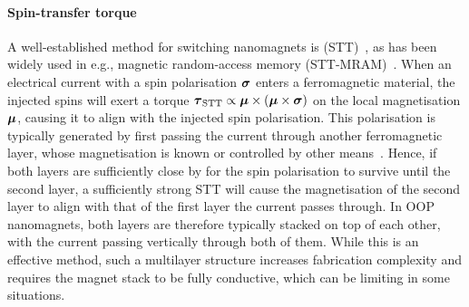 \paragraph{Spin-transfer torque}
A well-established method for switching nanomagnets is  (STT)~\cite{SlonczewskiSTT}, as has been widely used in e.g., magnetic random-access memory (STT-MRAM)~\cite{brataas2012current}.
When an electrical current with a spin polarisation $\boldsymbol{\mathbf{\sigma}}$ enters a ferromagnetic material, the injected spins will exert a torque $\boldsymbol{\mathbf{\tau}}_\mathrm{STT} \propto \boldsymbol{\mathbf{\mu}} \times (\boldsymbol{\mathbf{\mu}} \times \boldsymbol{\mathbf{\sigma}})$ on the local magnetisation $\boldsymbol{\mathbf{\mu}}$, causing it to align with the injected spin polarisation.
This polarisation is typically generated by first passing the current through another ferromagnetic layer, whose magnetisation is known or controlled by other means~\cite{SOT_FM_AFM,mumax3tutorial}.
Hence, if both layers are sufficiently close by for the spin polarisation to survive until the second layer, a sufficiently strong STT will cause the magnetisation of the second layer to align with that of the first layer the current passes through.
In OOP nanomagnets, both layers are therefore typically stacked on top of each other, with the current passing vertically through both of them.
While this is an effective method, such a multilayer structure increases fabrication complexity and requires the magnet stack to be fully conductive, which can be limiting in some situations.

